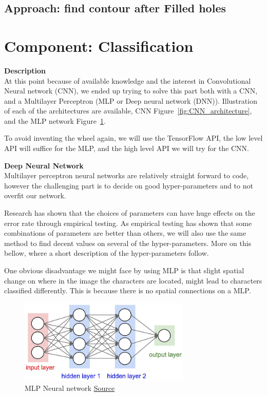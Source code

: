 \documentclass[11pt,a4paper,UKenglish]{report}
\begin{document}
\subsection{Approach: find contour after Filled holes}







\section{Component: Classification}
\label{Method:Classification}
\textbf{Description} \\
At this point because of available knowledge and the interest in
Convolutional Neural network (CNN), we ended up trying to solve this part
both with a CNN, and a Multilayer Perceptron (MLP or Deep neural network (DNN)).
Illustration of each of the architectures are available, CNN Figure~\ref{fig:CNN_architecture},
and the MLP network Figure~\ref{fig:neural_net2}. \par
To avoid inventing the wheel again, we will use the TensorFlow API, the low
level API will suffice for the MLP, and the high level API we will try for the
CNN.

\begin{flushleft}
  \textbf{Deep Neural Network} \\
  Multilayer perceptron neural networks are relatively straight
  forward to code, however the challenging part is to decide on good
  hyper-parameters and to not overfit our network. \par
  Research has shown that the choices of parameters can have huge effects on
  the error rate through empirical testing. As empirical testing has shown that
  some combinations of parameters are better than others, we will also use the
  same method to find decent values on several of the hyper-parameters. More on
  this bellow, where a short description of the hyper-parameters follow. \par
  One obvious disadvantage we might face by using MLP is that slight spatial
  change on where in the image the characters are located, might lead to
  characters classified differently. This is because there is no spatial
  connections on a MLP.
\end{flushleft}

\begin{figure}[H]
  \centering
  \includegraphics[height=4cm]{res/neural_net2.jpeg}
  \caption{MLP Neural network \href{http://cs231n.github.io/neural-networks-1/}{Source}}
  \label{fig:neural_net2}
\end{figure}
\end{document}
